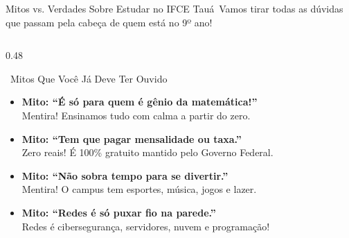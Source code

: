 
\begin{frame}{Mitos vs. Verdades Sobre Estudar no IFCE Tauá}{\faCheckSquare\ Vamos tirar todas as dúvidas que passam pela cabeça de quem está no 9º ano!}
  \begin{columns}[t]
    \begin{column}{0.48\textwidth}
      \begin{redcard}{\faTimesCircle\ Mitos Que Você Já Deve Ter Ouvido}
        \tiny
        \begin{itemize}\setlength{\itemsep}{0.18em}
          \item \textbf{Mito: ``É só para quem é gênio da matemática!''} \\
          \textcolor{TechGray}{Mentira! Ensinamos tudo com calma a partir do zero.}
          \item \textbf{Mito: ``Tem que pagar mensalidade ou taxa.''} \\
          \textcolor{TechGray}{Zero reais! É 100\% gratuito mantido pelo Governo Federal.}
          \item \textbf{Mito: ``Não sobra tempo para se divertir.''} \\
          \textcolor{TechGray}{Mentira! O campus tem esportes, música, jogos e lazer.}
          \item \textbf{Mito: ``Redes é só puxar fio na parede.''} \\
          \textcolor{TechGray}{Redes é cibersegurança, servidores, nuvem e programação!}
        \end{itemize}
      \end{redcard}
    \end{column}
    

\end{columns}
\end{frame}
